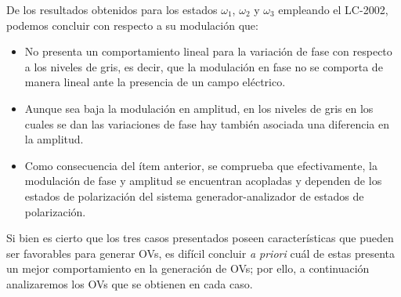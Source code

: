 

De los resultados obtenidos para los estados $\omega_1$, $\omega_2$ y $\omega_3$ empleando el LC-2002, podemos concluir con respecto a su modulación que:

\begin{itemize}
\item No presenta un comportamiento lineal para la variación de fase con respecto a los niveles de gris, es decir, que la modulación en fase no se comporta de manera lineal ante la presencia de un campo eléctrico.
\item Aunque sea baja la modulación en amplitud, en los niveles de gris en los cuales se dan las variaciones de fase hay también asociada una diferencia en la amplitud.
\item Como consecuencia del ítem anterior, se comprueba que efectivamente, la modulación de fase y amplitud se encuentran acopladas y dependen de los estados de polarización del sistema generador-analizador de estados de polarización.
\end{itemize}



Si bien es cierto que los tres casos presentados poseen características que pueden ser favorables para generar OVs, es difícil concluir \textit{a priori} cuál de estas presenta un mejor comportamiento en la generación de OVs; por ello, a continuación analizaremos los OVs que se obtienen en cada caso.

